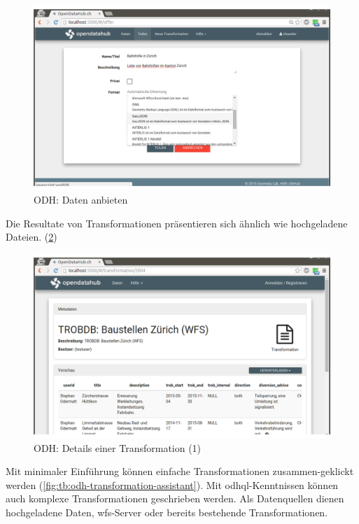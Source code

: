 \begin{figure}[H]
    \centering
    \includegraphics[width=2\linewidth/3]{fig/odh-offer-data}
    \caption{ODH: Daten anbieten}
    \label{fig:tb:odh-offer-data}
\end{figure}

Die Resultate von Transformationen präsentieren sich ähnlich wie hochgeladene Dateien.
(\cref{fig:tb:odh-transformation-detail})
\begin{figure}
    \centering
    \includegraphics[width=2\linewidth/3]{fig/odh-transformation-detail}
    \caption{ODH: Details einer Transformation (1)}
    \label{fig:tb:odh-transformation-detail}
\end{figure}

Mit minimaler Einführung können einfache Transformationen zusammen-geklickt werden (\cref{fig:tb:odh-transformation-assistant}). Mit \acs{odhql}-Kenntnissen können auch komplexe Transformationen geschrieben werden. Als Datenquellen dienen hochgeladene Daten, \acs{wfs}-Server oder bereits bestehende Transformationen.


